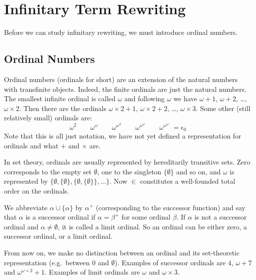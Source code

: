 \chapter{Infinitary Term Rewriting}\label{chap:rewriting}

Before we can study infinitary rewriting, we must introduce ordinal numbers.


\section{Ordinal Numbers}


Ordinal numbers (ordinals for short) are an extension of the natural numbers
with transfinite objects. Indeed, the finite ordinals are just the natural
numbers. The smallest infinite ordinal is called $\omega$ and following
$\omega$ we have $\omega + 1$, $\omega + 2$, \ldots, $\omega \times 2$. Then
there are the ordinals $\omega \times 2 + 1$, $\omega \times 2 + 2$, \ldots,
$\omega \times 3$. Some other (still relatively small) ordinals are:
\begin{displaymath}
  \omega^2 \qquad
  \omega^\omega \qquad
  \omega^{\omega^2} \qquad
  \omega^{\omega^\omega} \qquad
  \omega^{\omega^{\omega^{\ldots}}} = \epsilon_0 %
\end{displaymath}
Note that this is all just notation, we have not yet defined a representation
for ordinals and what $+$ and $\times$ are.

In set theory, ordinals are usually represented by hereditarily transitive
sets. Zero corresponds to the empty set $\emptyset$, one to the singleton $\{
\emptyset \}$ and so on, and $\omega$ is represented by $\{ \emptyset, \{
\emptyset \}, \{ \emptyset, \{ \emptyset \} \} , \ldots \}$. Now $\in$
constitutes a well-founded total order on the ordinals.

We abbreviate $\alpha \cup \{ \alpha \}$ by $\alpha^+$ (corresponding to the
successor function) and say that $\alpha$ is a successor ordinal if $\alpha =
\beta^+$ for some ordinal $\beta$. If $\alpha$ is not a successor ordinal and
$\alpha \neq \emptyset$, it is called a limit ordinal. So an ordinal can
be either zero, a successor ordinal, or a limit ordinal.

From now on, we make no distinction between an ordinal and its set-theoretic
representation (e.g.\ between $0$ and $\emptyset$). Examples of successor
ordinals are $4$, $\omega + 7$  and $\omega^{\omega \times 2} + 1$. Examples
of limit ordinals are $\omega$ and $\omega \times 3$.

